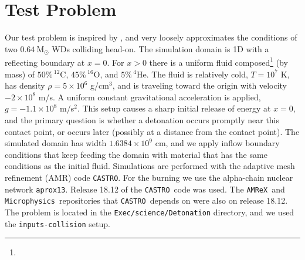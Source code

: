 \documentclass[twocolumn,numberedappendix,trackchanges]{../aastex62}
\newcommand{\msolar}{\mathrm{M}_\odot}
\newcommand{\amrex}{\texttt{AMReX}}
\newcommand{\castro}{\texttt{CASTRO}}
\newcommand{\microphysics}{\texttt{Microphysics}}
\begin{document}
\section{Test Problem}
\label{sec:collisions}

Our test problem is inspired by \cite{kushnir:2013}, and very loosely approximates the
conditions of two $0.64\ \msolar$ WDs colliding head-on. The simulation domain is 1D with a
reflecting boundary at $x = 0$. For $x > 0$ there is a uniform fluid composed\footnote{
} (by mass)
of $50\%\, ^{12}$C, $45\%\, ^{16}$O, and $5\%\, ^{4}$He.   The fluid is relatively cold,
$T = 10^7$ K, has density $\rho = 5 \times 10^6$ g/cm$^3$, and is traveling toward the
origin with velocity $-2 \times 10^8$ m/s. A uniform constant gravitational acceleration
is applied, $g = -1.1 \times 10^8$ m/s$^{2}$. This setup causes a sharp initial release
of energy at $x = 0$, and the primary question is whether a detonation occurs promptly
near this contact point, or occurs later (possibly at a distance from the contact point).
The simulated domain has width $1.6384 \times 10^9$ cm, and we apply inflow boundary conditions
that keep feeding the domain with material that has the same conditions as the initial fluid.
Simulations are performed with the adaptive mesh refinement (AMR) code \castro.
For the burning we use the alpha-chain nuclear network
\texttt{aprox13}. 
Release 18.12 of the \castro\ code was used. The \amrex\ and \microphysics\ repositories
that \castro\ depends on were also on release 18.12. The problem is located in the
\texttt{Exec/science/Detonation} directory, and we used the \texttt{inputs-collision} setup.
\end{document}
